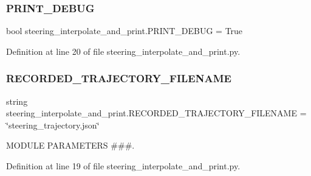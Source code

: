 \subsubsection{\texorpdfstring{PRINT\_DEBUG}{PRINT\_DEBUG}}
{\footnotesize\ttfamily bool steering\+\_\+interpolate\+\_\+and\+\_\+print.\+P\+R\+I\+N\+T\+\_\+\+D\+E\+B\+UG = True}



Definition at line 20 of file steering\+\_\+interpolate\+\_\+and\+\_\+print.\+py.

\mbox{\label{namespacesteering__interpolate__and__print_a43ff4edddfa844fcd5bfbcc0fb56991e}} 
\subsubsection{\texorpdfstring{RECORDED\_TRAJECTORY\_FILENAME}{RECORDED\_TRAJECTORY\_FILENAME}}
{\footnotesize\ttfamily string steering\+\_\+interpolate\+\_\+and\+\_\+print.\+R\+E\+C\+O\+R\+D\+E\+D\+\_\+\+T\+R\+A\+J\+E\+C\+T\+O\+R\+Y\+\_\+\+F\+I\+L\+E\+N\+A\+ME = \char`\"{}steering\+\_\+trajectory.\+json\char`\"{}}



M\+O\+D\+U\+LE P\+A\+R\+A\+M\+E\+T\+E\+RS \#\#\#. 



Definition at line 19 of file steering\+\_\+interpolate\+\_\+and\+\_\+print.\+py.

